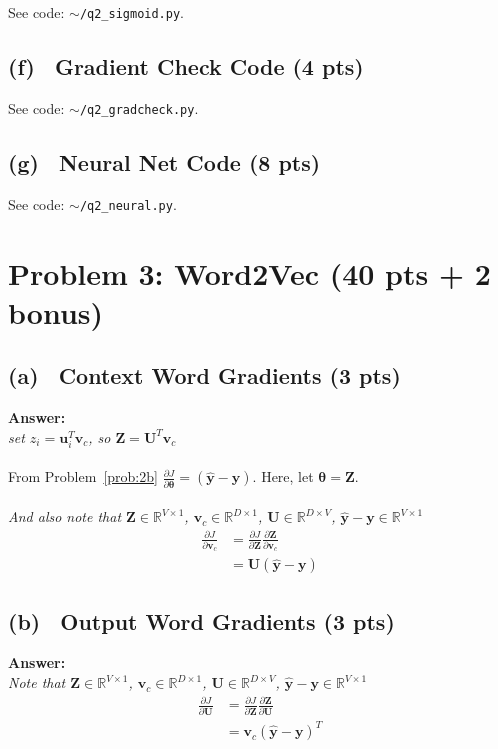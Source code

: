 \documentclass[fleqn]{MJD}
\newcommand{\problem}[1]{\chapter{Problem #1}}
\newcommand{\subproblem}[2]{\section{(#1)~ #2}}
\newcommand{\0}{\emptyset}
\begin{document}
\noindent See code: $\sim$\verb|/q2_sigmoid.py|.

\subproblem{f}{Gradient Check Code (4 pts)}

\noindent See code: $\sim$\verb|/q2_gradcheck.py|.

\subproblem{g}{Neural Net Code (8 pts)}

\noindent See code: $\sim$\verb|/q2_neural.py|.



\newpage

\problem{3: Word2Vec (40 pts + 2 bonus)}

\subproblem{a}{Context Word Gradients (3 pts)}

\noindent \textbf{Answer:} \\

\textit {set $z_{i}=\bm{u}_{i}^{T} \bm{v}_{c}$, so $\bm{Z}=\bm{U}^{T}\bm{v}_{c}$} \\
\\
\noindent From Problem~\ref{prob:2b} $\frac{\partial J}{\partial \bm{\theta}} = (\hat{\bm{y}} - \bm{y})$. Here, let $\bm{\theta} = \bm{Z}$. \\  \\
\textit {And also note that $\bm{Z} \in \mathbb{R}^{V \times 1}$, $\bm{v}_{c} \in  \mathbb{R}^{D \times 1}$, $\bm{U} \in \mathbb{R}^{D \times V}$,  $\bm{\hat{y}}-\bm{y} \in \mathbb{R}^{V \times 1}$}
\begin{align}
	\frac{\partial J}{\partial \bm{v}_{c}} &= %
	 		 \frac{\partial J}{\partial \bm{Z}} \frac{\partial \bm{Z}}{\partial \bm{v}_{c}} \nonumber \\
			&=
	 		\bm{U} (\hat{\bm{y}} - \bm{y}) \nonumber
\end{align}

\subproblem{b}{Output Word Gradients (3 pts)}

\noindent \textbf{Answer:} \\

\textit {Note that $\bm{Z} \in \mathbb{R}^{V \times 1}$, $\bm{v}_{c} \in  \mathbb{R}^{D \times 1}$, $\bm{U} \in \mathbb{R}^{D \times V}$,  $\bm{\hat{y}}-\bm{y} \in \mathbb{R}^{V \times 1}$}
\begin{align}
	\frac{\partial J}{\partial \bm{U}} &= %
	 		 \frac{\partial J}{\partial \bm{Z}} \frac{\partial \bm{Z}}{\partial \bm{U}} \nonumber \\
			&=
	 		 \bm{v}_{c} (\hat{\bm{y}} - \bm{y})^{T} \nonumber
\end{align}
\end{document}
